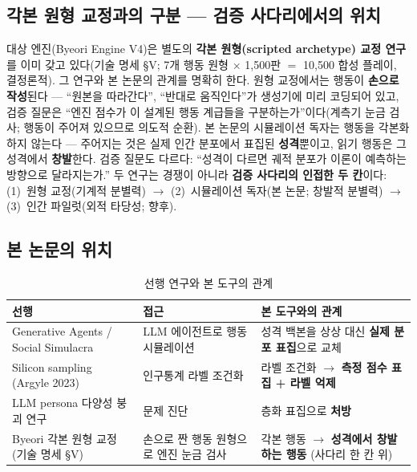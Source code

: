 \documentclass[11pt, a4paper]{article}
\begin{document}
\subsection{각본 원형 교정과의 구분 --- 검증 사다리에서의 위치}

대상 엔진(Byeori Engine V4)은 별도의 \textbf{각본 원형(scripted archetype) 교정 연구}를 이미 갖고 있다(기술 명세 \S V; 7개 행동 원형 $\times$ 1{,}500판 $=$ 10{,}500 합성 플레이, 결정론적). 그 연구와 본 논문의 관계를 명확히 한다. 원형 교정에서는 행동이 \textbf{손으로 작성}된다 --- ``원본을 따라간다'', ``반대로 움직인다''가 생성기에 미리 코딩되어 있고, 검증 질문은 ``엔진 점수가 이 설계된 행동 계급들을 구분하는가''이다(계측기 눈금 검사; 행동이 주어져 있으므로 의도적 순환). 본 논문의 시뮬레이션 독자는 행동을 각본화하지 않는다 --- 주어지는 것은 실제 인간 분포에서 표집된 \textbf{성격}뿐이고, 읽기 행동은 그 성격에서 \textbf{창발}한다. 검증 질문도 다르다: ``성격이 다르면 궤적 분포가 이론이 예측하는 방향으로 달라지는가.'' 두 연구는 경쟁이 아니라 \textbf{검증 사다리의 인접한 두 칸}이다: (1)~원형 교정(기계적 분별력) $\rightarrow$ (2)~시뮬레이션 독자(본 논문; 창발적 분별력) $\rightarrow$ (3)~인간 파일럿(외적 타당성; 향후).

\subsection{본 논문의 위치}

\begin{table}[H]
\centering
\caption{선행 연구와 본 도구의 관계}
\begin{tabular}{p{4.2cm} p{4.4cm} p{5.2cm}}
\toprule
\textbf{선행} & \textbf{접근} & \textbf{본 도구와의 관계} \\
\midrule
Generative Agents / Social Simulacra & LLM 에이전트로 행동 시뮬레이션 & 성격 백본을 상상 대신 \textbf{실제 분포 표집}으로 교체 \\
Silicon sampling (Argyle 2023) & 인구통계 라벨 조건화 & 라벨 조건화 $\rightarrow$ \textbf{측정 점수 표집 + 라벨 억제} \\
LLM persona 다양성 붕괴 연구 & 문제 진단 & 층화 표집으로 \textbf{처방} \\
Byeori 각본 원형 교정 (기술 명세 \S V) & 손으로 짠 행동 원형으로 엔진 눈금 검사 & 각본 행동 $\rightarrow$ \textbf{성격에서 창발하는 행동} (사다리 한 칸 위) \\
\bottomrule
\end{tabular}
\end{table}

\end{document}
